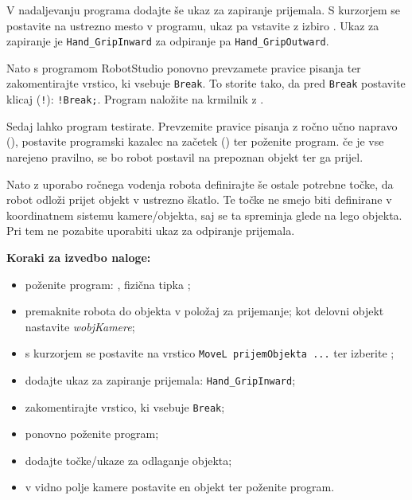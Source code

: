 V nadaljevanju programa dodajte še ukaz za zapiranje prijemala. S kurzorjem se postavite na ustrezno mesto v programu, ukaz pa vstavite z izbiro  . Ukaz za zapiranje je \verb"Hand_GripInward" za odpiranje pa \verb"Hand_GripOutward".


Nato s programom RobotStudio ponovno prevzamete pravice pisanja ter zakomentirajte vrstico, ki vsebuje \verb"Break". To storite tako, da pred \verb"Break" postavite klicaj (\verb"!"): \verb"!Break;". Program naložite na krmilnik z .

Sedaj lahko program testirate. Prevzemite pravice pisanja z ročno učno napravo (), postavite programski kazalec na začetek () ter poženite program. če je vse narejeno pravilno, se bo robot postavil na prepoznan objekt ter ga prijel.

Nato z uporabo ročnega vodenja robota definirajte še ostale potrebne točke, da robot odloži prijet objekt v ustrezno škatlo. Te točke ne smejo biti definirane v koordinatnem sistemu kamere/objekta, saj se ta spreminja glede na lego objekta. Pri tem ne pozabite uporabiti ukaz za odpiranje prijemala.


\vspace{5mm}

\begin{mdframed}[backgroundcolor=yellow!20, shadow=true,roundcorner=8pt]
	\textbf{Koraki za izvedbo naloge:}
	\begin{itemize}
		\item poženite program: , fizična tipka ;
		\item premaknite robota do objekta v položaj za prijemanje; kot delovni objekt nastavite \emph{wobjKamere};
		\item s kurzorjem se postavite na vrstico \verb"MoveL prijemObjekta ..." ter izberite ;
		\item dodajte ukaz za zapiranje prijemala: \verb"Hand_GripInward";
		\item zakomentirajte vrstico, ki vsebuje \verb"Break";
		\item ponovno poženite program;
		\item dodajte točke/ukaze za odlaganje objekta;
		\item v vidno polje kamere postavite en objekt ter poženite program.
	\end{itemize}
\end{mdframed}


